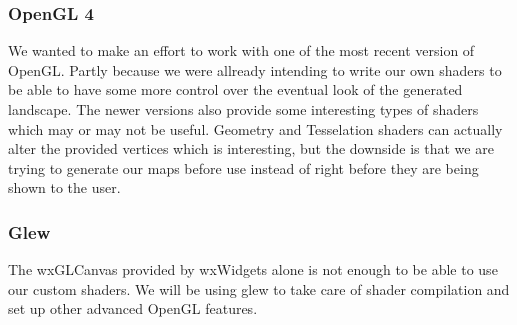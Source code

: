 \subsubsection{OpenGL 4}
We wanted to make an effort to work with one of the most recent version of OpenGL. Partly because we were allready intending to write our own shaders to be able to have some more control over the eventual look of the generated landscape. The newer versions also provide some interesting types of shaders which may or may not be useful. Geometry and Tesselation shaders can actually alter the provided vertices which is interesting, but the downside is that we are trying to generate our maps before use instead of right before they are being shown to the user.

\subsubsection{Glew}
The wxGLCanvas provided by wxWidgets alone is not enough to be able to use our custom shaders. We will be using glew to take care of shader compilation and set up other advanced OpenGL features.